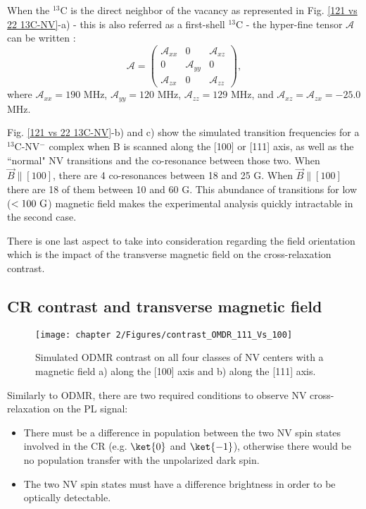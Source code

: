 \documentclass[a4paper, 11pt]{report}
\begin{document}
When the $^{13}$C is the direct neighbor of the vacancy as represented in Fig. \ref{121 vs 22 13C-NV}-a) - this is also referred as a first-shell $^{13}$C - the hyper-fine tensor $\mathcal{A}$ can be written \citep{simanovskaia2013sidebands}:
$$ \mathcal{A} = \begin{pmatrix}
\mathcal{A}_{xx} & 0 & \mathcal{A}_{xz} \\ 0 & \mathcal{A}_{yy} & 0 \\ \mathcal{A}_{zx} & 0 & \mathcal{A}_{zz}
\end{pmatrix},$$
where $\mathcal{A}_{xx}=190$ MHz, $\mathcal{A}_{yy}=120$ MHz, $\mathcal{A}_{zz}=129$ MHz, and $\mathcal{A}_{xz}=\mathcal{A}_{zx}=-25.0$ MHz. 

Fig. \ref{121 vs 22 13C-NV}-b) and c) show the simulated transition frequencies for a $^{13}$C-NV$^-$ complex when B is scanned along the [100] or [111] axis, as well as the ``normal" NV transitions and the co-resonance between those two. When $\vec{B} \parallel [100]$, there are 4 co-resonances between 18 and 25 G. When $\vec{B} \parallel [100]$ there are 18 of them between 10 and 60 G. This abundance of transitions for low ($<100\ \rm G$) magnetic field makes the experimental analysis quickly intractable in the second case.

There is one last aspect to take into consideration regarding the field orientation which is the impact of the transverse magnetic field on the cross-relaxation contrast.

\subsection{CR contrast and transverse magnetic field}
\label{CR contrast}

\begin{figure}[h]
\centering
\texttt{[image: chapter 2/Figures/contrast\_OMDR\_111\_Vs\_100]}
\caption{Simulated ODMR contrast on all four classes of NV centers with a magnetic field a) along the [100] axis and b) along the [111] axis.}
\label{121 vs 22 contrast}
\end{figure}

Similarly to ODMR, there are two required conditions to observe NV cross-relaxation on the PL signal: 
\begin{itemize}
\item There must be a difference in population between the two NV spin states involved in the CR (e.g. $\ket{0}$ and $\ket{-1}$), otherwise there would be no population transfer with the unpolarized dark spin.
\item The two NV spin states must have a difference brightness in order to be optically detectable.
\end{itemize}
\end{document}
